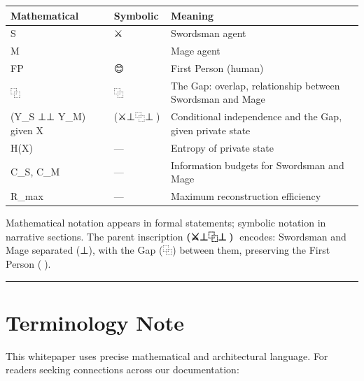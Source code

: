 \documentclass[
]{article}
\newcounter{none} %
\begin{document}
{\def\LTcaptype{none} %
\begin{longtable}[]{@{}
  >{\raggedright\arraybackslash}p{}
  >{\raggedright\arraybackslash}p{}
  >{\raggedright\arraybackslash}p{}@{}}
\toprule\noalign{}
\begin{minipage}[b]{\linewidth}\raggedright
Mathematical
\end{minipage} & \begin{minipage}[b]{\linewidth}\raggedright
Symbolic
\end{minipage} & \begin{minipage}[b]{\linewidth}\raggedright
Meaning
\end{minipage} \\
\midrule\noalign{}
\endhead
\bottomrule\noalign{}
\endlastfoot
S & ⚔️ & Swordsman agent \\
M & 🧙 & Mage agent \\
FP & 😊 & First Person (human) \\
⿻ & ⿻ & The Gap: overlap, relationship between Swordsman and Mage \\
(Y\_S ⊥⊥ Y\_M) given X & (⚔️⊥⿻⊥🧙)🙂 & Conditional independence and the
Gap, given private state \\
H(X) & --- & Entropy of private state \\
C\_S, C\_M & --- & Information budgets for Swordsman and Mage \\
R\_max & --- & Maximum reconstruction efficiency \\
\end{longtable}
}

Mathematical notation appears in formal statements; symbolic notation in
narrative sections. The parent inscription \textbf{(⚔️⊥⿻⊥🧙)🙂}
encodes: Swordsman and Mage separated (⊥), with the Gap (⿻) between
them, preserving the First Person (🙂).

\begin{center}\rule{0.5\linewidth}{0.5pt}\end{center}

\section{Terminology Note}\label{terminology-note}

This whitepaper uses precise mathematical and architectural language.
For readers seeking connections across our documentation:
\end{document}
